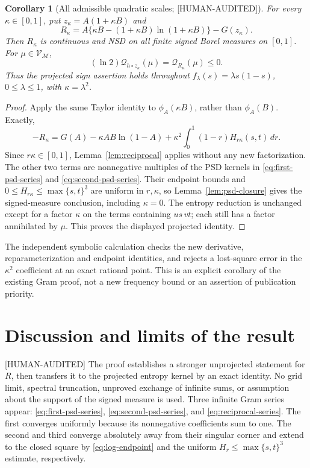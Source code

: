 \documentclass[11pt]{article}
\theoremstyle{plain}
\newtheorem{corollary}[theorem]{Corollary}
\theoremstyle{definition}
\theoremstyle{remark}
\newcommand{\M}{\mathcal M}
\newcommand{\V}{\mathcal V}
\newcommand{\QF}{\mathcal Q}
\newcommand{\status}[1]{\textnormal{\textsf{\footnotesize[#1]}}}
\newcommand{\HumanAudited}{\status{HUMAN-AUDITED}}
\begin{document}
\begin{corollary}[All admissible quadratic scales; \HumanAudited]
\label{cor:scaled-h1}
For every \(\kappa\in[0,1]\), put \(z_\kappa=A(1+\kappa B)\) and
\[
R_\kappa=A\{\kappa B-(1+\kappa B)\ln(1+\kappa B)\}-G(z_\kappa).
\]
Then \(R_\kappa\) is continuous and NSD on all finite signed Borel measures
on \([0,1]\).  For \(\mu\in\V_{\M}\),
\[
(\ln2)\QF_{h\circ z_\kappa}(\mu)=\QF_{R_\kappa}(\mu)\le0.
\]
Thus the projected sign assertion holds throughout
\(f_\lambda(s)=\lambda s(1-s)\), \(0\le\lambda\le1\),
with \(\kappa=\lambda^2\).
\end{corollary}
\begin{proof}
Apply the same Taylor identity to \(\phi_A(\kappa B)\), rather than
\(\phi_A(B)\).  Exactly,
\[
-R_\kappa=G(A)-\kappa AB\ln(1-A)
       +\kappa^2\int_0^1(1-r)H_{r\kappa}(s,t)\,dr.
\]
Since \(r\kappa\in[0,1]\), Lemma~\ref{lem:reciprocal} applies without
any new factorization.  The other two terms are nonnegative multiples
of the PSD kernels in \eqref{eq:first-psd-series} and
\eqref{eq:second-psd-series}.  Their endpoint bounds and
\(0\le H_{r\kappa}\le\max\{s,t\}^3\) are uniform in \(r,\kappa\),
so Lemma~\ref{lem:psd-closure} gives the signed-measure conclusion,
including \(\kappa=0\).
The entropy reduction is unchanged except for a factor \(\kappa\) on
the terms containing \(us\,vt\); each still has a factor annihilated
by \(\mu\).  This proves the displayed projected identity.
\end{proof}

The independent symbolic calculation
 checks the new derivative,
reparameterization and endpoint identities, and rejects a lost-square
error in the \(\kappa^2\) coefficient at an exact rational point.
This is an explicit corollary of the existing Gram proof, not a new
frequency bound or an assertion of publication priority.

\section{Discussion and limits of the result}
\label{sec:discussion}

\HumanAudited{} The proof establishes a stronger unprojected statement for
\(R\), then transfers it to the projected entropy kernel by an exact identity.
No grid limit, spectral truncation, unproved exchange of infinite sums, or
assumption about the support of the signed measure is used.  Three infinite
Gram series appear: \eqref{eq:first-psd-series},
\eqref{eq:second-psd-series}, and \eqref{eq:reciprocal-series}.  The first
converges uniformly because its nonnegative coefficients sum to one.  The
second and third converge absolutely away from their singular corner and
extend to the closed square by \eqref{eq:log-endpoint} and the uniform
\(H_r\le\max\{s,t\}^3\) estimate, respectively.
\end{document}
